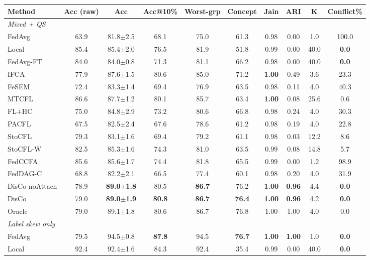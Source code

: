 \scriptsize
\setlength{\tabcolsep}{3.2pt}
\begin{tabular}{lccccccccc}
\toprule
Method & Acc (raw) & Acc & Acc@10\% & Worst-grp & Concept & Jain & ARI & K & Conflict\% \\
\midrule
\multicolumn{10}{l}{\textit{Mixed + QS}}\\
FedAvg & 63.9 & 81.8$\pm$2.5 & 68.1 & 75.0 & 61.3 & 0.98 & 0.00 & 1.0 & 100.0 \\
Local & 85.4 & 85.4$\pm$2.0 & 76.5 & 81.9 & 51.8 & 0.99 & 0.00 & 40.0 & \textbf{0.0} \\
FedAvg-FT & 84.0 & 84.0$\pm$0.8 & 71.3 & 81.1 & 66.2 & 0.98 & 0.00 & 40.0 & \textbf{0.0} \\
IFCA & 77.9 & 87.6$\pm$1.5 & 80.6 & 85.0 & 71.2 & \textbf{1.00} & 0.49 & 3.6 & 23.3 \\
FeSEM & 72.4 & 83.3$\pm$1.4 & 69.4 & 76.9 & 63.5 & 0.98 & 0.11 & 4.0 & 40.3 \\
MTCFL & 86.6 & 87.7$\pm$1.2 & 80.1 & 85.7 & 63.4 & \textbf{1.00} & 0.08 & 25.6 & 0.6 \\
FL+HC & 75.0 & 84.8$\pm$2.9 & 73.2 & 80.6 & 66.8 & 0.98 & 0.24 & 4.0 & 30.3 \\
PACFL & 67.5 & 82.5$\pm$2.4 & 67.6 & 78.6 & 61.2 & 0.98 & 0.19 & 4.0 & 22.8 \\
StoCFL & 79.3 & 83.1$\pm$1.6 & 69.4 & 79.2 & 61.1 & 0.98 & 0.03 & 12.2 & 8.6 \\
StoCFL-W & 82.5 & 85.3$\pm$1.6 & 74.3 & 81.0 & 63.5 & 0.99 & 0.08 & 14.8 & 5.7 \\
FedCCFA & 85.6 & 85.6$\pm$1.7 & 74.4 & 81.8 & 65.5 & 0.99 & 0.00 & 1.2 & 98.9 \\
FedDAG-C & 68.8 & 82.2$\pm$2.1 & 66.5 & 77.4 & 60.1 & 0.98 & 0.20 & 4.0 & 31.9 \\
DisCo-noAttach & 78.9 & \textbf{89.0$\pm$1.8} & 80.5 & \textbf{86.7} & 76.2 & \textbf{1.00} & \textbf{0.96} & 4.4 & \textbf{0.0} \\
DisCo & 79.0 & \textbf{89.0$\pm$1.9} & \textbf{80.8} & \textbf{86.7} & \textbf{76.4} & \textbf{1.00} & \textbf{0.96} & 4.2 & \textbf{0.0} \\
Oracle & 79.0 & 89.1$\pm$1.8 & 80.6 & 86.7 & 76.8 & 1.00 & 1.00 & 4.0 & 0.0 \\
\midrule
\multicolumn{10}{l}{\textit{Label skew only}}\\
FedAvg & 79.5 & 94.5$\pm$0.8 & \textbf{87.8} & 94.5 & \textbf{76.7} & \textbf{1.00} & \textbf{1.00} & 1.0 & \textbf{0.0} \\
Local & 92.4 & 92.4$\pm$1.6 & 84.3 & 92.4 & 35.4 & 0.99 & 0.00 & 40.0 & \textbf{0.0} \\

\end{tabular}
